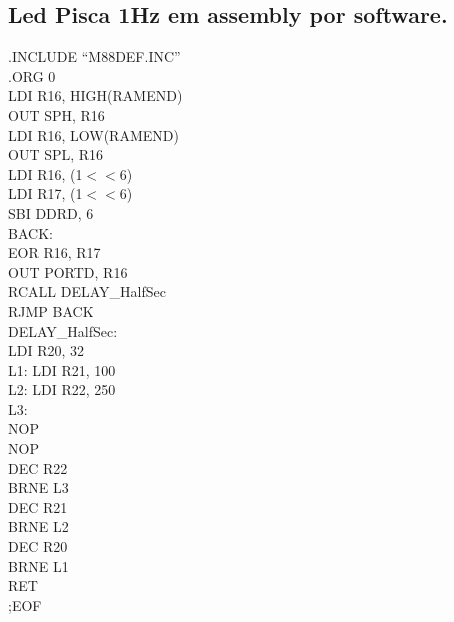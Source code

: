 \documentclass[titlepage, a4paper, 10pt, reqno, openany]{report}
\begin{document}
\subsection{Led Pisca 1Hz em assembly por software.}
\begin{minipage}[T]{.3\linewidth}
.INCLUDE \textquotedblleft M88DEF.INC\textquotedblright \\
.ORG 0 \\
\hspace*{.5cm}	LDI R16, HIGH(RAMEND) \\
\hspace*{.5cm}	OUT SPH, R16 \\
\hspace*{.5cm}	LDI R16, LOW(RAMEND) \\
\hspace*{.5cm}	OUT SPL, R16 \\
\hspace*{.5cm}	LDI R16, (1$<<$6) \\
\hspace*{.5cm}	LDI R17, (1$<<$6) \\
\hspace*{.5cm}	SBI DDRD, 6 \\
BACK: \\
\hspace*{.5cm}	EOR R16, R17 \\
\hspace*{.5cm}	OUT PORTD, R16 \\
\hspace*{.5cm}	RCALL DELAY\_HalfSec \\
\hspace*{.5cm}	RJMP BACK \\
DELAY\_HalfSec: \\
\hspace*{.5cm}	LDI R20, 32 \\
L1:	\hspace{.5cm} LDI R21, 100 \\
L2:	\hspace{.5cm} LDI R22, 250 \\
L3: \hspace{.5cm} \\
\hspace*{.5cm}	NOP \\
\hspace*{.5cm}	NOP \\
\hspace*{.5cm}	DEC R22 \\
\hspace*{.5cm}	BRNE L3 \\
\hspace*{.8cm}	DEC R21 \\
\hspace*{.5cm}	BRNE L2 \\
\hspace*{.8cm}	DEC R20 \\
\hspace*{.5cm}	BRNE L1 \\
\hspace*{.8cm}	RET \\[1ex]%
;EOF \\
\end{minipage}
\end{document}
